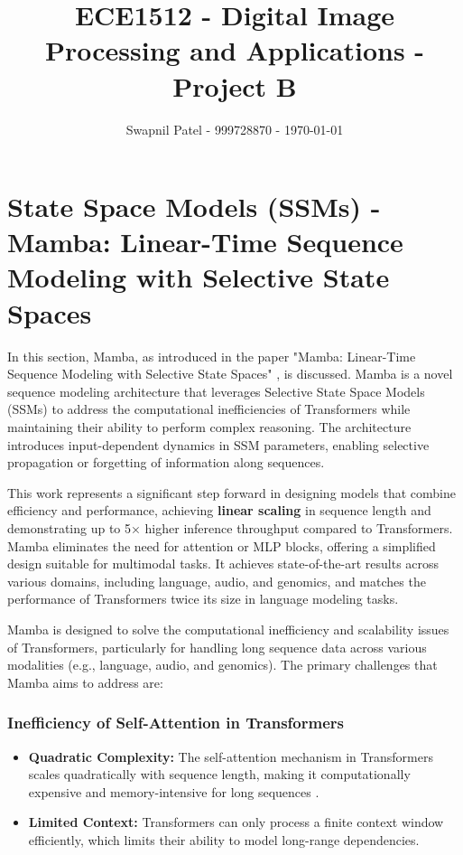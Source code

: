 \documentclass[12pt, conference, compsoc, onecolumn]{IEEEtran}
\begin{document}
	\title{ECE1512 - Digital Image Processing and Applications - Project B}
	\author{Swapnil Patel - 999728870 - \today}
	
	\author{
		}
	
	\maketitle
	
	\section{State Space Models (SSMs) - Mamba: Linear-Time Sequence Modeling with Selective State Spaces}
	In this section, Mamba, as introduced in the paper "Mamba: Linear-Time Sequence Modeling with Selective State Spaces" \cite{gu2024mamba}, is discussed. Mamba is a novel sequence modeling architecture that leverages Selective State Space Models (SSMs) to address the computational inefficiencies of Transformers while maintaining their ability to perform complex reasoning. The architecture introduces input-dependent dynamics in SSM parameters, enabling selective propagation or forgetting of information along sequences.
	
	This work represents a significant step forward in designing models that combine efficiency and performance, achieving \textbf{linear scaling} in sequence length and demonstrating up to 5× higher inference throughput compared to Transformers. Mamba eliminates the need for attention or MLP blocks, offering a simplified design suitable for multimodal tasks. It achieves state-of-the-art results across various domains, including language, audio, and genomics, and matches the performance of Transformers twice its size in language modeling tasks.
	
	Mamba is designed to solve the computational inefficiency and scalability issues of Transformers, particularly for handling long sequence data across various modalities (e.g., language, audio, and genomics). The primary challenges that Mamba aims to address are:
	
	\subsubsection*{Inefficiency of Self-Attention in Transformers}
	\begin{itemize}
		\item \textbf{Quadratic Complexity:} The self-attention mechanism in Transformers scales quadratically with sequence length, making it computationally expensive and memory-intensive for long sequences \cite{vaswani2023attentionneed}.
		\item \textbf{Limited Context:} Transformers can only process a finite context window efficiently, which limits their ability to model long-range dependencies.
	\end{itemize}
	
\end{document}

